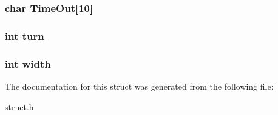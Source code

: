 \subsubsection[{\texorpdfstring{Time\+Out}{TimeOut}}]{\setlength{\rightskip}{0pt plus 5cm}char Time\+Out\mbox{[}10\mbox{]}}\hypertarget{struct___map_ab1aeb27b976555390e2429e283a877b7}{}\label{struct___map_ab1aeb27b976555390e2429e283a877b7}
\subsubsection[{\texorpdfstring{turn}{turn}}]{\setlength{\rightskip}{0pt plus 5cm}int turn}\hypertarget{struct___map_aaefa47f4fdf865c2358c22b542a993e4}{}\label{struct___map_aaefa47f4fdf865c2358c22b542a993e4}
\subsubsection[{\texorpdfstring{width}{width}}]{\setlength{\rightskip}{0pt plus 5cm}int width}\hypertarget{struct___map_a2474a5474cbff19523a51eb1de01cda4}{}\label{struct___map_a2474a5474cbff19523a51eb1de01cda4}


The documentation for this struct was generated from the following file\+:\begin{DoxyCompactItemize}
\item 
struct.\+h\end{DoxyCompactItemize}
